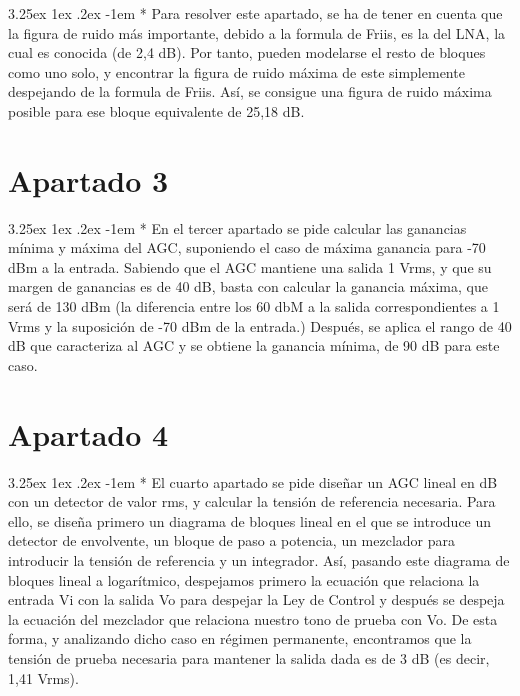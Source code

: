 \documentclass[12pt]{article}
\makeatletter
\renewcommand\paragraph{\@startsection{paragraph}{5}{\z@}%
  {3.25ex \@plus1ex \@minus.2ex}%
  {-1em}%
  {\normalfont\normalsize\bfseries}}
\makeatother
\begin{document}
    \paragraph*{}
    Para resolver este apartado, se ha de tener en cuenta que la figura de ruido más importante, debido a la formula de Friis, es la del LNA, la cual es conocida (de 2,4 dB).
    Por tanto, pueden modelarse el resto de bloques como uno solo, y encontrar la figura de ruido máxima de este simplemente despejando de la formula de Friis. Así,
    se consigue una figura de ruido máxima posible para ese bloque equivalente de 25,18 dB.


  \section{Apartado 3}
  
    \paragraph*{}
    En el tercer apartado se pide calcular las ganancias mínima y máxima del AGC, suponiendo el caso de máxima ganancia para -70 dBm a la entrada.
    Sabiendo que el AGC mantiene una salida 1 Vrms, y que su margen de ganancias es de 40 dB, basta con calcular la ganancia máxima, que será de 130 dBm
    (la diferencia entre los 60 dbM a la salida correspondientes a 1 Vrms y la suposición de -70 dBm de la entrada.) Después, se aplica el rango de 40 dB que
    caracteriza al AGC y se obtiene la ganancia mínima, de 90 dB para este caso.
 

  \section{Apartado 4}
  
    \paragraph*{}
    El cuarto apartado se pide diseñar un AGC lineal en dB con un detector de valor rms, y calcular la tensión de referencia necesaria.
    Para ello, se diseña primero un diagrama de bloques lineal en el que se introduce un detector de envolvente, un bloque de paso a potencia,
    un mezclador para introducir la tensión de referencia y un integrador. Así, pasando este diagrama de bloques lineal a logarítmico, despejamos primero
    la ecuación que relaciona la entrada Vi con la salida Vo para despejar la Ley de Control y después se despeja la ecuación del mezclador que relaciona nuestro
    tono de prueba con Vo. De esta forma, y analizando dicho caso en régimen permanente, encontramos que la tensión de prueba necesaria para mantener la salida dada es de 3 dB (es decir, 
    1,41 Vrms).
\end{document}

